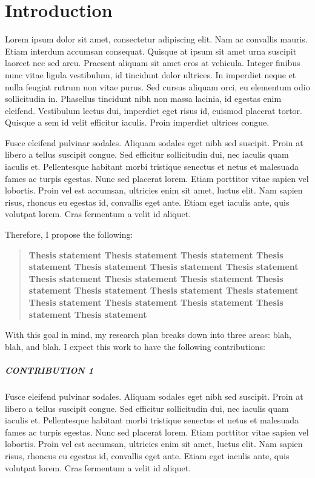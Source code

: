 \documentclass[oneside]{memoir}
\begin{document}
\SingleSpacing

\newpage
\setcounter{tocdepth}{3}
\tableofcontents

\newpage
\listoffigures

\DoubleSpacing

%
%

\chapter{Introduction}

Lorem ipsum dolor sit amet, consectetur adipiscing elit. Nam ac convallis mauris. Etiam interdum accumsan consequat. Quisque at ipsum sit amet urna suscipit laoreet nec sed arcu. Praesent aliquam sit amet eros at vehicula. Integer finibus nunc vitae ligula vestibulum, id tincidunt dolor ultrices. In imperdiet neque et nulla feugiat rutrum non vitae purus. Sed cursus aliquam orci, eu elementum odio sollicitudin in. Phasellus tincidunt nibh non massa lacinia, id egestas enim eleifend. Vestibulum lectus dui, imperdiet eget risus id, euismod placerat tortor. Quisque a sem id velit efficitur iaculis. Proin imperdiet ultrices congue.

Fusce eleifend pulvinar sodales. Aliquam sodales eget nibh sed suscipit. Proin at libero a tellus suscipit congue. Sed efficitur sollicitudin dui, nec iaculis quam iaculis et. Pellentesque habitant morbi tristique senectus et netus et malesuada fames ac turpis egestas. Nunc sed placerat lorem. Etiam porttitor vitae sapien vel lobortis. Proin vel est accumsan, ultricies enim sit amet, luctus elit. Nam sapien risus, rhoncus eu egestas id, convallis eget ante. Etiam eget iaculis ante, quis volutpat lorem. Cras fermentum a velit id aliquet.

Therefore, I propose the following:
%
\begin{quotation}\bfseries
Thesis statement Thesis statement Thesis statement Thesis statement Thesis statement Thesis statement Thesis statement Thesis statement Thesis statement Thesis statement Thesis statement Thesis statement Thesis statement Thesis statement Thesis statement Thesis statement Thesis statement Thesis statement Thesis statement 
\end{quotation}
%
With this goal in mind, my research plan breaks down into three areas: blah, blah, and blah.
I expect this work to have the following contributions:

\paragraph{CONTRIBUTION 1} Fusce eleifend pulvinar sodales. Aliquam sodales eget nibh sed suscipit. Proin at libero a tellus suscipit congue. Sed efficitur sollicitudin dui, nec iaculis quam iaculis et. Pellentesque habitant morbi tristique senectus et netus et malesuada fames ac turpis egestas. Nunc sed placerat lorem. Etiam porttitor vitae sapien vel lobortis. Proin vel est accumsan, ultricies enim sit amet, luctus elit. Nam sapien risus, rhoncus eu egestas id, convallis eget ante. Etiam eget iaculis ante, quis volutpat lorem. Cras fermentum a velit id aliquet.
\end{document}

